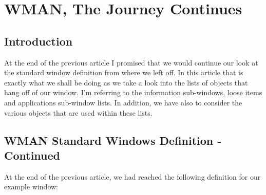 \chapter{WMAN, The Journey Continues}

\section{Introduction}
\label{ch23-intro}%

At the end of the previous
article I promised that we would continue our look at the standard window definition from
where we left off. In this article that is exactly what we shall be doing as we take a
look into the lists of objects that hang off of our window. I'm referring to the
information sub-{}windows, loose items and applications sub-{}window lists. In addition, we
have also to consider the various objects that are used within these lists.

\section{WMAN Standard Windows Definition -{} Continued}
\label{ch23-std-windef-cntd}%

At the end of the previous article, we had reached the following
definition for our example window:

